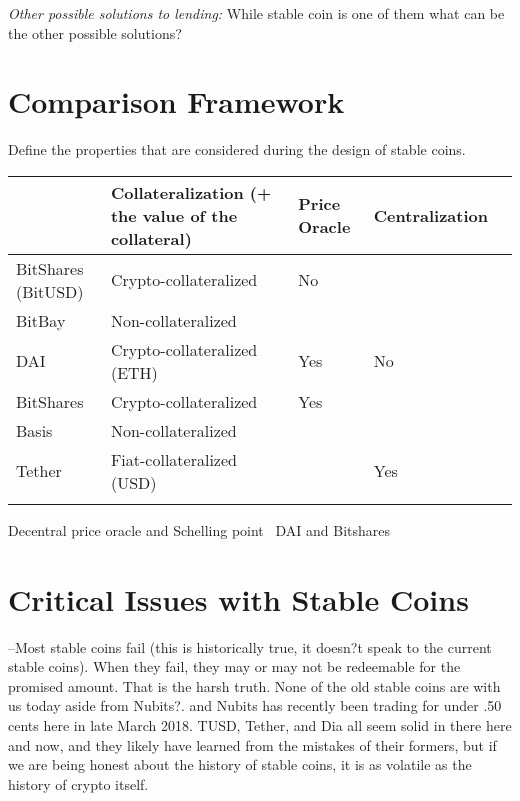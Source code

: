 \textit{Other possible solutions to lending:} While stable coin is one of them what can be the other possible solutions?

\section{Comparison Framework} %
Define the properties that are considered during the design of stable coins.
~
\begin{table}[]
	\begin{tabular}{|l|l|l|l|l|}
		\hline
		& Collateralization (+ the value of the collateral) & Price Oracle & Centralization  \\ \hline
		BitShares (BitUSD) &  Crypto-collateralized &  No & \\ \hline
		BitBay & Non-collateralized & &  \\ \hline
		 DAI& Crypto-collateralized (ETH)  &  Yes& No \\ \hline
		 BitShares&Crypto-collateralized&Yes&\\ \hline
		 Basis&Non-collateralized&& \\ \hline
		 Tether & Fiat-collateralized (USD) & & Yes \\ \hline
		  &&& \\ \hline
	\end{tabular}
\end{table}

Decentral price oracle and Schelling point~\cite{cryptoinsider}
DAI and Bitshares~\cite{cryptoinsider}

\section{Critical Issues with Stable Coins}

--Most stable coins fail (this is historically true, it doesn?t speak to the current stable coins). When they fail, they may or may not be redeemable for the promised amount. That is the harsh truth. None of the old stable coins are with us today aside from Nubits?. and Nubits has recently been trading for under .50 cents here in late March 2018. TUSD, Tether, and Dia all seem solid in there here and now, and they likely have learned from the mistakes of their formers, but if we are being honest about the history of stable coins, it is as volatile as the history of crypto itself.

